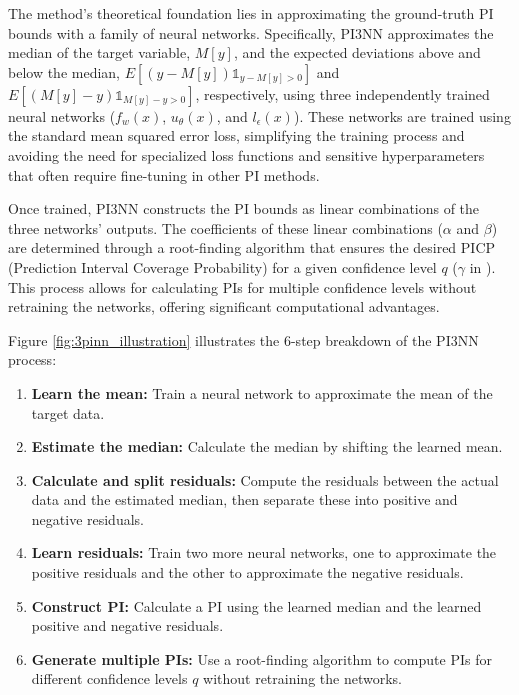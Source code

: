\documentclass{article}
\begin{document}
The method's theoretical foundation lies in approximating the ground-truth PI bounds with a family of neural networks. Specifically, PI3NN approximates the median of the target variable, $M[y]$, and the expected deviations above and below the median, $E[(y - M[y])\mathbb{1}_{y-M[y]>0}]$ and $E[(M[y] - y)\mathbb{1}_{M[y]-y>0}]$, respectively, using three independently trained neural networks ($f_w(x)$, $u_\theta(x)$, and $l_\epsilon(x)$). These networks are trained using the standard mean squared error loss, simplifying the training process and avoiding the need for specialized loss functions and sensitive hyperparameters that often require fine-tuning in other PI methods.

Once trained, PI3NN constructs the PI bounds as linear combinations of the three networks' outputs. The coefficients of these linear combinations ($\alpha$ and $\beta$) are determined through a root-finding algorithm that ensures the desired PICP (Prediction Interval Coverage Probability) for a given confidence level $q$ ($\gamma$ in \cite{pi3nn}). This process allows for calculating PIs for multiple confidence levels without retraining the networks, offering significant computational advantages.


Figure \ref{fig:3pinn_illustration} illustrates the 6-step breakdown of the PI3NN process:
\begin{enumerate}
    \item \textbf{Learn the mean:} Train a neural network to approximate the mean of the target data.
    \item \textbf{Estimate the median:} Calculate the median by shifting the learned mean.
    \item \textbf{Calculate and split residuals:} Compute the residuals between the actual data and the estimated median, then separate these into positive and negative residuals.
    \item \textbf{Learn residuals:} Train two more neural networks, one to approximate the positive residuals and the other to approximate the negative residuals.
    \item \textbf{Construct PI:} Calculate a PI using the learned median and the learned positive and negative residuals.
    \item \textbf{Generate multiple PIs:} Use a root-finding algorithm to compute PIs for different confidence levels $q$ without retraining the networks.
\end{enumerate}
\end{document}
